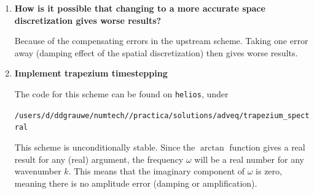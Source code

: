 \documentclass[a4paper,fleqn]{article}
\begin{document}
\begin{enumerate}
\begin{equation*}
\begin{array}{ccccc}
			\end{array}\right)
			\left(\begin{array}{c}
				\phi_1	\\	\vdots \\	\phi_{j-1}	\\	\phi_{j}	\\	\phi_{j+1}	\\	\vdots \\ \phi_n
			\end{array}\right)
		\end{equation*}
		If you think writing out this system is hard, try solving it ;-) Although efficient techniques exist for solving tridiagonal systems, it remains a daunting job, especially for 2D or 3D problems.\vspace{2ex}
	\setcounter{enumi}{3}
	\item \textbf{How is it possible that changing to a more accurate space discretization gives worse results?}
		\par
		Because of the compensating errors in the upstream scheme. Taking one error away (damping effect of the spatial discretization) then gives worse results.\vspace{2ex}
	\item \textbf{Implement trapezium timestepping}
		\par
		The code for this scheme can be found on \texttt{helios}, under
		\par
		\texttt{/users/d/ddgrauwe/numtech/\unskip/practica/solutions/adveq/trapezium\_spectral}
		\par
		This scheme is unconditionally stable. Since the $\arctan$ function gives a real result for any (real) argument, the frequency $\omega$ will be a real number for any wavenumber $k$. This means that the imaginary component of $\omega$ is zero, meaning there is no amplitude error (damping or amplification).
\end{enumerate}
%
\end{document}
